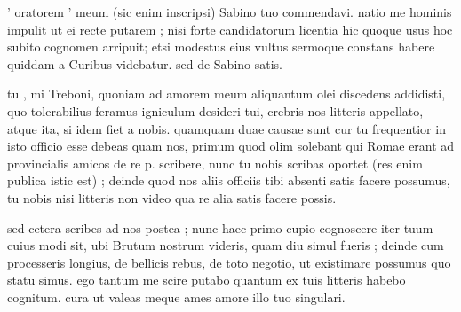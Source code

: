 


 ' oratorem ' meum (sic enim inscripsi) Sabino tuo commendavi. natio me hominis impulit ut ei recte putarem ; nisi forte candidatorum licentia hic quoque usus hoc subito cognomen arripuit; etsi modestus eius vultus sermoque constans habere quiddam a Curibus videbatur. sed de Sabino satis.

 tu , mi Treboni, quoniam ad amorem meum aliquantum olei discedens addidisti, quo tolerabilius feramus igniculum desideri tui, crebris nos litteris appellato, atque ita, si idem fiet a nobis. quamquam duae causae sunt cur tu frequentior in isto officio esse debeas quam nos, primum quod olim solebant qui Romae erant ad provincialis amicos de re p. scribere, nunc tu nobis scribas oportet (res enim publica istic est) ; deinde quod nos aliis officiis tibi absenti satis facere possumus, tu nobis nisi litteris non video qua re alia satis facere possis.

 sed cetera scribes ad nos postea ; nunc haec primo cupio cognoscere iter tuum cuius modi sit, ubi Brutum nostrum videris, quam diu simul fueris ; deinde cum processeris longius, de bellicis rebus, de toto negotio, ut existimare possumus quo statu simus. ego tantum me scire putabo quantum ex tuis litteris habebo cognitum. cura ut valeas meque ames amore illo tuo singulari.
